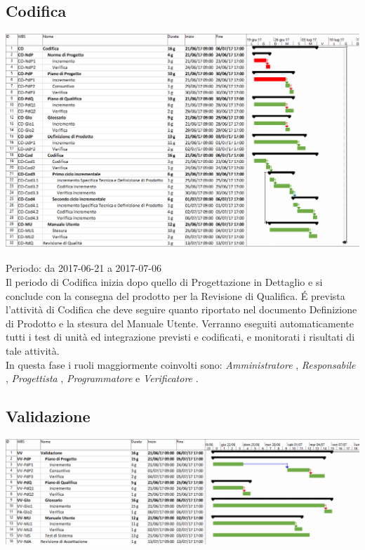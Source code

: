\subsection{Codifica}

\begin{center}
  \includegraphics[scale=0.23]{img/5-CO.png}
\end{center}

Periodo: da 2017-06-21 a 2017-07-06 \\
Il periodo di Codifica inizia dopo quello di Progettazione in Dettaglio e si conclude
con la consegna del prodotto per la Revisione di Qualifica. \'E prevista l'attività di
Codifica che deve seguire quanto riportato nel documento Definizione
di Prodotto e la stesura del Manuale Utente. 
Verranno eseguiti automaticamente tutti i test di unità ed
integrazione previsti e codificati, e monitorati i risultati di tale attività.
\\

In questa fase i ruoli maggiormente coinvolti sono:  \emph{Amministratore} ,  \emph{Responsabile} ,
 \emph{Progettista} ,  \emph{Programmatore}  e  \emph{Verificatore} .

\subsection{Validazione}

\begin{center}
  \includegraphics[scale=0.18]{img/6-VA.png}
\end{center}

